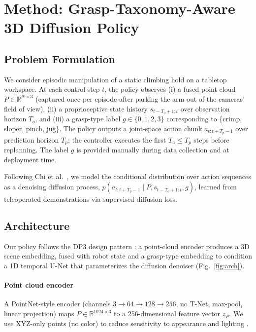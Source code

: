 \documentclass[letterpaper, 10pt, journal, twoside]{IEEEtran}
\begin{document}
\section{Method: Grasp-Taxonomy-Aware 3D Diffusion Policy}
\label{sec:method}

\subsection{Problem Formulation}
We consider episodic manipulation of a static climbing hold on a tabletop workspace.
At each control step $t$, the policy observes (i) a fused point cloud
$P \in \mathbb{R}^{N \times 3}$ (captured once per episode after parking the arm out
of the cameras' field of view), (ii) a proprioceptive state history $s_{t-T_o+1:t}$
over observation horizon $T_o$, and (iii) a grasp-type label $g \in \{0,1,2,3\}$
corresponding to \{crimp, sloper, pinch, jug\}. The policy outputs a joint-space
action chunk $a_{t:t+T_p-1}$ over prediction horizon $T_p$; the controller executes
the first $T_a \le T_p$ steps before replanning. The label $g$ is provided manually
during data collection and at deployment time.

Following Chi et al.~\cite{chi2023diffusionpolicy}, we model the conditional
distribution over action sequences as a denoising diffusion process,
$p(a_{t:t+T_p-1} \mid P, s_{t-T_o+1:t}, g)$, learned from teleoperated demonstrations
via supervised diffusion loss.

\subsection{Architecture}
\label{sec:arch}
Our policy follows the DP3 design pattern \cite{ze2024dp3}: a point-cloud encoder
produces a 3D scene embedding, fused with robot state and a grasp-type embedding to
condition a 1D temporal U-Net that parameterizes the diffusion denoiser
(Fig.~\ref{fig:arch}).

\paragraph*{Point cloud encoder}
A PointNet-style encoder \cite{qi2017pointnet} (channels $3 \to 64 \to 128 \to 256$,
no T-Net, max-pool, linear projection) maps $P \in \mathbb{R}^{1024 \times 3}$ to a
256-dimensional feature vector $z_P$. We use XYZ-only points (no color) to reduce
sensitivity to appearance and lighting \cite{ze2024dp3}.
\end{document}
